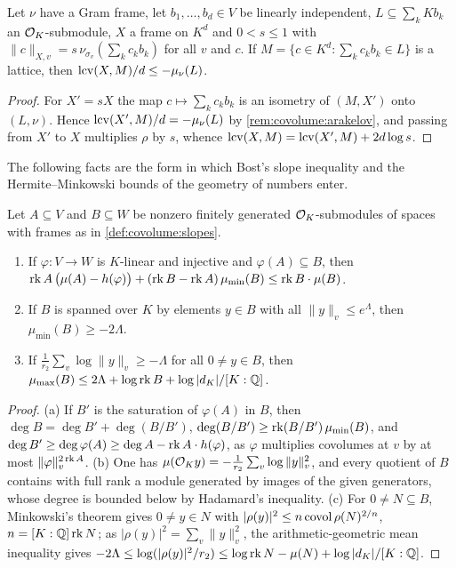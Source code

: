 \begin{lemma}\label{lem:covolume:lcv-slope}
Let $\nu$ have a Gram frame, let $b_1,\dots,b_d\in V$ be linearly independent, $L\subseteq\sum_kKb_k$
an $\mathcal{O}_K$-submodule, $X$ a frame on $K^d$ and $0<s\le1$ with
$\|c\|_{X,v}=s\,\nu_{\sigma_v}(\sum_kc_kb_k)$ for all $v$ and $c$. If
$M=\{c\in K^d:\sum_kc_kb_k\in L\}$ is a lattice, then $\operatorname{lcv}(X,M)/d\le-\mu_\nu(L)$.
\end{lemma}

\begin{proof}
For $X'=sX$ the map $c\mapsto\sum_kc_kb_k$ is an isometry of $(M,X')$ onto $(L,\nu)$. Hence
$\operatorname{lcv}(X',M)/d=-\mu_\nu(L)$ by \cref{rem:covolume:arakelov}, and passing from $X'$ to $X$
multiplies $\rho$ by $s$, whence $\operatorname{lcv}(X,M)=\operatorname{lcv}(X',M)+2d\log s$.
\end{proof}

The following facts are the form in which Bost's slope inequality \cite{Bost1996,Bost2001} and the
Hermite--Minkowski bounds of the geometry of numbers enter.

\begin{lemma}\label{lem:covolume:slopes}
Let $A\subseteq V$ and $B\subseteq W$ be nonzero finitely generated $\mathcal{O}_K$-submodules of spaces with
frames as in \cref{def:covolume:slopes}.
\begin{enumerate}[label=(\alph*)]
\item If $\varphi\colon V\to W$ is $K$-linear and injective and $\varphi(A)\subseteq B$, then\\
$\operatorname{rk} A\,\bigl(\mu(A)-h(\varphi)\bigr)+(\operatorname{rk} B-\operatorname{rk} A)\,\mu_{\min}(B)\le\operatorname{rk} B\cdot\mu(B)$.
\item If $B$ is spanned over $K$ by elements $y\in B$ with all $\|y\|_v\le e^\Lambda$, then
$\mu_{\min}(B)\ge-2\Lambda$.
\item If $\frac1{r_2}\sum_v\log\|y\|_v\ge-\Lambda$ for all $0\ne y\in B$, then
$\mu_{\max}(B)\le2\Lambda+\log\operatorname{rk} B+\log|d_K|/[K:\mathbb{Q}]$.
\end{enumerate}
\end{lemma}

\begin{proof}
(a) If $B'$ is the saturation of $\varphi(A)$ in $B$, then $\deg B=\deg B'+\deg(B/B')$,
$\deg(B/B')\ge\operatorname{rk}(B/B')\,\mu_{\min}(B)$, and
$\deg B'\ge\deg\varphi(A)\ge\deg A-\operatorname{rk} A\cdot h(\varphi)$, as $\varphi$ multiplies covolumes at
$v$ by at most $\|\varphi\|_v^{2\operatorname{rk} A}$. (b) One has $\mu(\mathcal{O}_Ky)=-\frac1{r_2}\sum_v\log\|y\|_v^2$,
and every quotient of $B$ contains with full rank a module generated by images of the given
generators, whose degree is bounded below by Hadamard's inequality. (c) For $0\ne N\subseteq B$,
Minkowski's theorem gives $0\ne y\in N$ with $|\rho(y)|^2\le n\operatorname{covol}\rho(N)^{2/n}$,
$n=[K:\mathbb{Q}]\operatorname{rk} N$; as $|\rho(y)|^2=\sum_v\|y\|_v^2$, the arithmetic-geometric mean inequality gives
$-2\Lambda\le\log(|\rho(y)|^2/r_2)\le\log\operatorname{rk} N-\mu(N)+\log|d_K|/[K:\mathbb{Q}]$.
\end{proof}

